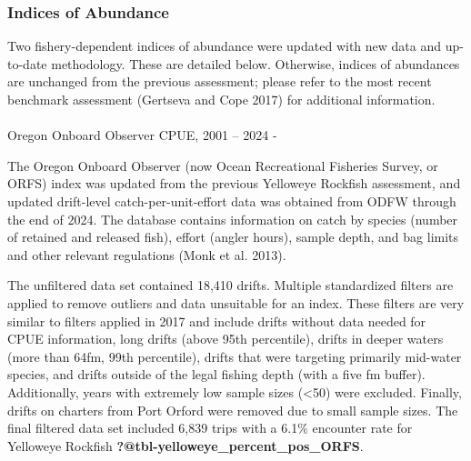 \documentclass[
]{scrartcl}
\makeatletter
\let\oldparagraph\paragraph
\renewcommand{\paragraph}{
    \@ifstar
      \xxxParagraphStar
      \xxxParagraphNoStar
  }
\newcommand{\xxxParagraphStar}[1]{\oldparagraph*{#1}\mbox{}}
\newcommand{\xxxParagraphNoStar}[1]{\oldparagraph{#1}\mbox{}}
\makeatother
\begin{document}
\subsubsection{Indices of Abundance}\label{indices-of-abundance}

Two fishery-dependent indices of abundance were updated with new data
and up-to-date methodology. These are detailed below. Otherwise, indices
of abundances are unchanged from the previous assessment; please refer
to the most recent benchmark assessment (Gertseva and Cope 2017) for
additional information.

\paragraph{Oregon Onboard Observer CPUE, 2001 -- 2024
-}\label{oregon-onboard-observer-cpue-2001-2024--}

The Oregon Onboard Observer (now Ocean Recreational Fisheries Survey, or
ORFS) index was updated from the previous Yelloweye Rockfish assessment,
and updated drift-level catch-per-unit-effort data was obtained from
ODFW through the end of 2024. The database contains information on catch
by species (number of retained and released fish), effort (angler
hours), sample depth, and bag limits and other relevant regulations
(Monk et al. 2013).

The unfiltered data set contained 18,410 drifts. Multiple standardized
filters are applied to remove outliers and data unsuitable for an index.
These filters are very similar to filters applied in 2017 and include
drifts without data needed for CPUE information, long drifts (above 95th
percentile), drifts in deeper waters (more than 64fm, 99th percentile),
drifts that were targeting primarily mid-water species, and drifts
outside of the legal fishing depth (with a five fm buffer).
Additionally, years with extremely low sample sizes (\textless50) were
excluded. Finally, drifts on charters from Port Orford were removed due
to small sample sizes. The final filtered data set included 6,839 trips
with a 6.1\% encounter rate for Yelloweye Rockfish
\textbf{?@tbl-yelloweye\_percent\_pos\_ORFS}.
\end{document}
